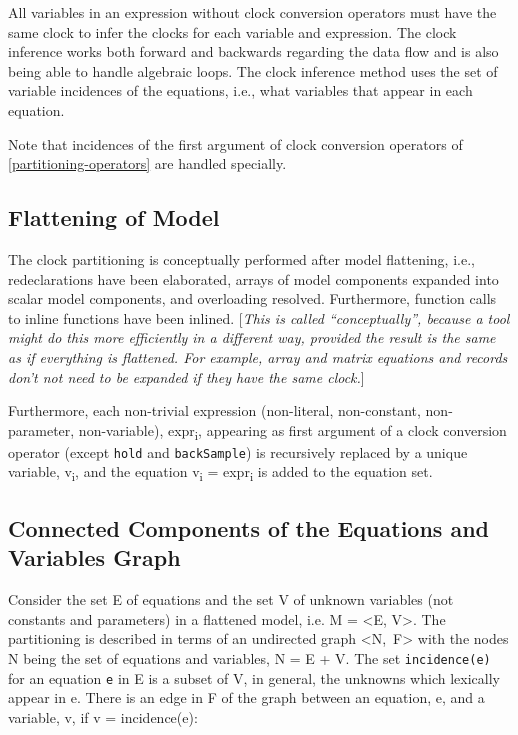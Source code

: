 All variables in an expression without clock conversion operators must
have the same clock to infer the clocks for each variable and
expression. The clock inference works both forward and backwards
regarding the data flow and is also being able to handle algebraic
loops. The clock inference method uses the set of variable incidences of
the equations, i.e., what variables that appear in each equation.

Note that incidences of the first argument of clock conversion operators
of \autoref{partitioning-operators} are handled specially.

\subsection{Flattening of Model}

The clock partitioning is conceptually performed after model flattening,
i.e., redeclarations have been elaborated, arrays of model components
expanded into scalar model components, and overloading resolved.
Furthermore, function calls to inline functions have been inlined.
{[}\emph{This is called ``conceptually'', because a tool might do this
more efficiently in a different way, provided the result is the same as
if everything is flattened. For example, array and matrix equations and
records don't not need to be expanded if they have the same clock.}{]}

Furthermore, each non-trivial expression (non-literal, non-constant,
non-parameter, non-variable), expr\textsubscript{i}, appearing as first
argument of a clock conversion operator (except \lstinline!hold! and \lstinline!backSample!) 
is recursively replaced by a
unique variable, v\textsubscript{i}, and the equation v\textsubscript{i}
= expr\textsubscript{i} is added to the equation set.

\subsection{Connected Components of the Equations and Variables Graph}

Consider the set E of equations and the set V of unknown variables (not
constants and parameters) in a flattened model, i.e. M = \textless{}E,
V\textgreater{}. The partitioning is described in terms of an undirected
graph \textless{}N,~F\textgreater{} with the nodes N being the set of
equations and variables, N = E + V. The set \lstinline!incidence(e)! for an equation
\lstinline!e! in E is a subset of V, in general, the unknowns which lexically appear
in e. There is an edge in F of the graph between an equation, e, and a
variable, v, if v = incidence(e):

